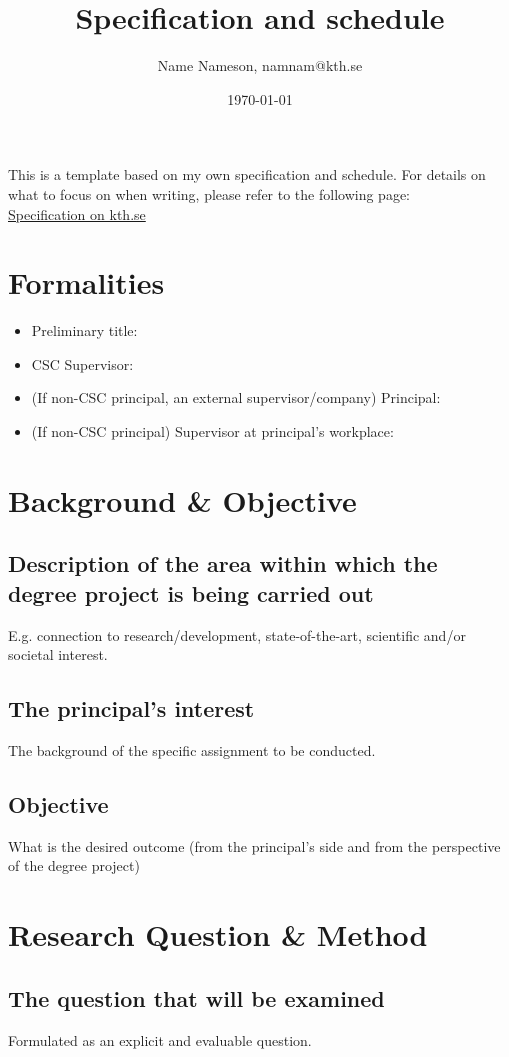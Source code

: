 \documentclass[12pt]{article}
\begin{document}
\title{Specification and schedule
}
\author{Name Nameson, namnam@kth.se}
\date{\today}

\maketitle
This is a template based on my own specification and schedule. For details on what to focus on when writing, please refer to the following page:\\
\href{https://www.kth.se/social/group/examensarbete-vid-cs/page/specification-with-timetable/}{Specification on kth.se}
\section*{Formalities}
\begin{itemize}
\item Preliminary title:
\item CSC Supervisor:
\item (If non-CSC principal, an external supervisor/company) Principal:
\item (If non-CSC principal) Supervisor at principal's workplace:
\end{itemize}

\section*{Background \& Objective}
\subsection*{Description of the area within which the degree project is being carried out}
E.g. connection to research/development, state-of-the-art, scientific and/or societal interest.
\subsection*{The principal's interest} 
The background of the specific assignment to be conducted.
\subsection*{Objective} 
What is the desired outcome (from the principal's side and from the perspective of the degree project)
\section*{Research Question \& Method}
\subsection*{The question that will be examined}
Formulated as an explicit and evaluable question.
\end{document}
